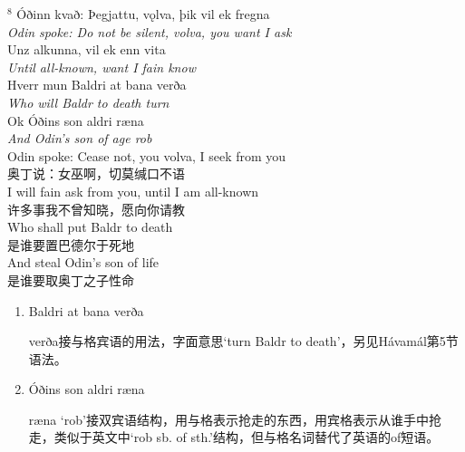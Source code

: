\begin{paracol}{2}
  \noindent
  $^8$ Óðinn kvað: Þegjattu, vǫlva, þik vil ek fregna\\
  \textit{Odin spoke: Do not be silent, volva, you want I ask}\\
  Unz alkunna, vil ek enn vita\\
  \textit{Until all-known, want I fain know}\\
  Hverr mun Baldri at bana verða\\
  \textit{Who will Baldr to death turn}\\
  Ok Óðins son aldri ræna\\
  \textit{And Odin's son of age rob}\\
  \switchcolumn
  \noindent
  Odin spoke: Cease not, you volva, I seek from you\\
  奥丁说：女巫啊，切莫缄口不语\\
  I will fain ask from you, until I am all-known\\
  许多事我不曾知晓，愿向你请教\\
  Who shall put Baldr to death\\
  是谁要置巴德尔于死地\\
  And steal Odin's son of life\\
  是谁要取奥丁之子性命\\
\end{paracol}
\begin{grammar*}{}
  \begin{enumerate}[leftmargin=*]
    \item Baldri at bana verða

          verða接与格宾语的用法，字面意思`turn Baldr to death'，另见Hávamál第5节语法。

    \item Óðins son aldri ræna

          ræna `rob'接双宾语结构，用与格表示抢走的东西，用宾格表示从谁手中抢走，类似于英文中`rob sb. of sth.'结构，但与格名词替代了英语的of短语。
  \end{enumerate}
\end{grammar*}


